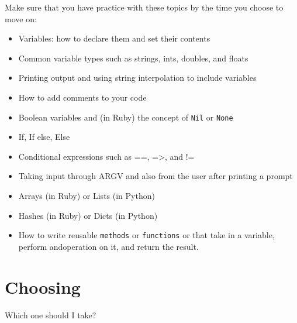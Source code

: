 \documentclass{42-en}
\begin{document}
Make sure that you have practice with these topics by the time you choose to move on:\\

\begin{itemize}

	\item Variables: how to declare them and set their contents
	\item Common variable types such as strings, ints, doubles, and floats
	\item Printing output and using string interpolation to include variables
	\item How to add comments to your code
	\item Boolean variables and (in Ruby) the concept of \texttt{Nil} or \texttt{None}
	\item If, If else, Else
	\item Conditional expressions such as ==, =>, and !=
	\item Taking input through ARGV and also from the user after printing a prompt
	\item Arrays (in Ruby) or Lists (in Python)
	\item Hashes (in Ruby) or Dicts (in Python)
	\item How to write reusable \texttt{methods} or \texttt{functions} or that take in a variable, perform andoperation on it, and return the result.

\end{itemize}



\chapter{Choosing}

Which one should I take?\\
\end{document}
